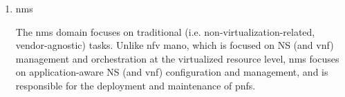 \begin{enumerate}
        \item \acrfull{nms}
        
        The \acrshort{nms} domain focuses on traditional (i.e. non-virtualization-related, vendor-agnostic) tasks. Unlike \acrshort{nfv} \acrshort{mano}, which is focused on NS (and \acrshort{vnf}) management and orchestration at the virtualized resource level, \acrshort{nms} focuses on application-aware NS (and \acrshort{vnf}) configuration and management, and is responsible for the deployment and maintenance of \acrshort{pnf}s.
        
        \end{enumerate}
